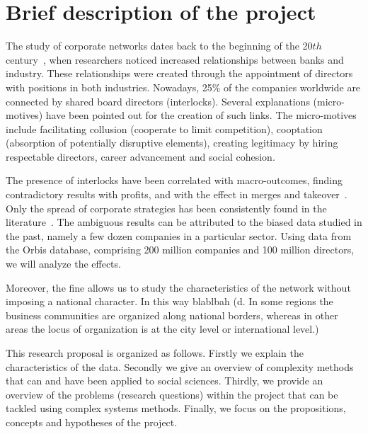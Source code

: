 \section{Brief description of the project}
\label{sec:description}
The study of corporate networks dates back to the beginning of the 20$th$ century~\citep{Lenin1999},
when researchers noticed increased relationships between banks and industry.
These relationships were created through the appointment of directors with positions in both industries.
Nowadays, 25\% of the companies worldwide are connected by shared board directors (interlocks).
Several explanations (micro-motives) have been pointed out for the creation of such links. 
The micro-motives include facilitating collusion (cooperate to limit competition), 
cooptation (absorption of potentially disruptive elements), 
creating legitimacy by hiring respectable directors, 
career advancement and social cohesion.


The presence of interlocks have been correlated with macro-outcomes, 
finding contradictory results with profits, and with the effect in merges and takeover~\citep{Mizruchi1996}.
Only the spread of corporate strategies has been consistently found in the literature~\citep{Mizruchi1996}. 
The ambiguous results can be attributed to the biased data studied in the past,
namely a few dozen companies in a particular sector.
Using data from the Orbis database, 
comprising 200 million companies and 100 million directors, 
we will analyze the effects.

Moreover, the fine allows us to study the characteristics of the network without imposing a national character. 
In this way blablbah (d. In some regions the business communities are organized along
national borders, whereas in other areas the locus of organization is at the
city level or international level.) 


This research proposal is organized as follows. 
Firstly we explain the characteristics of the data.
Secondly we give an overview of complexity methods that can and have been applied to social sciences.
Thirdly, we provide an overview of the problems (research questions) within the project that can be tackled using complex systems methods.
Finally, we focus on the propositions, concepts and hypotheses of the project.